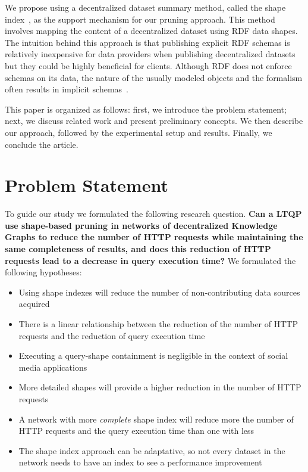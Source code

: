 We propose using a decentralized dataset summary method, called the shape index~\cite{tam2024opportunitiesshapebasedoptimizationlink}, as the support mechanism for our pruning approach.
This method involves mapping the content of a decentralized dataset using RDF data shapes.
The intuition behind this approach is that publishing explicit RDF schemas is relatively inexpensive for data providers when publishing decentralized datasets but they could be highly beneficial for clients.
Although RDF does not enforce schemas on its data, the nature of the usually modeled objects and the formalism often results in implicit schemas~\cite{Neumann2011CharacteristicSA}.

This paper is organized as follows: first, we introduce the problem statement; next, we discuss related work and present preliminary concepts.
We then describe our approach, followed by the experimental setup and results.
Finally, we conclude the article.

\section{Problem Statement}
To guide our study we formulated the following research question.
\textbf{Can a LTQP use shape-based pruning in networks of decentralized Knowledge Graphs to reduce the number of HTTP requests while maintaining the same completeness of results, and does this reduction of HTTP requests lead to a decrease in query execution time?}
We formulated the following hypotheses:
\begin{itemize}
    \item Using shape indexes will reduce the number of non-contributing data sources acquired
    \item There is a linear relationship between the reduction of the number of HTTP requests and the reduction of query execution time
    \item Executing a query-shape containment is negligible in the context of social media applications
    \item More detailed shapes will provide a higher reduction in the number of HTTP requests
    \item A network with more \emph{complete} shape index will reduce more the number of HTTP requests and the query execution time than one with less
    \item The shape index approach can be adaptative, so not every dataset in the network needs to have an index to see a performance improvement
\end{itemize}

